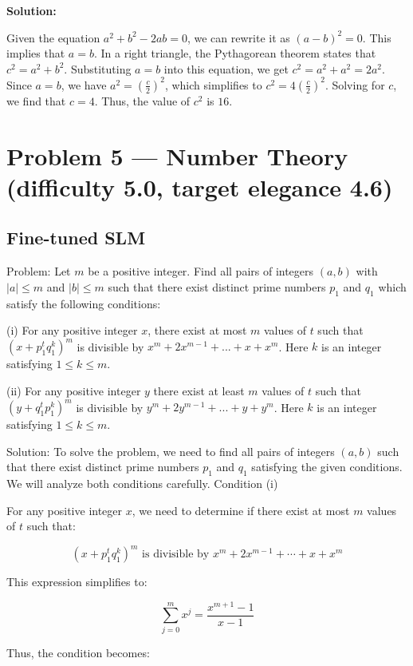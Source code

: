 \documentclass[11pt]{article}
\begin{document}
\textbf{Solution:}

Given the equation $a^2 + b^2 - 2ab = 0$, we can rewrite it as $(a - b)^2 = 0$. This implies that $a = b$. In a right triangle, the Pythagorean theorem states that $c^2 = a^2 + b^2$. Substituting $a = b$ into this equation, we get $c^2 = a^2 + a^2 = 2a^2$. Since $a = b$, we have $a^2 = \left(\frac{c}{2}\right)^2$, which simplifies to $c^2 = 4\left(\frac{c}{2}\right)^2$. Solving for $c$, we find that $c = 4$. Thus, the value of $c^2$ is $\boxed{16}$.

\section*{Problem 5 --- Number Theory (difficulty 5.0, target elegance 4.6)}

\subsection*{Fine-tuned SLM}

Problem:
Let $m$ be a positive integer. Find all pairs of integers $(a, b)$ with $|a| \le m$ and $|b| \le m$ such that there exist distinct prime numbers $p_1$ and $q_1$ which satisfy the following conditions:

(i) For any positive integer $x$, there exist at most $m$ values of $t$ such that
$\textstyle\left(x+p_1^{t} q_1^{k}\right)^{m}$ is divisible by $x^{m}+2 x^{m-1}+...+x+x^{m}$. Here $k$ is an integer satisfying $1\le k\le m$.

(ii) For any positive integer $y$ there exist at least $m$ values of $t$ such that 
$\textstyle\left(y+q_1^{t} p_1^{k}\right)^{m}$ is divisible by $y^{m}+2 y^{m-1}+...+y+y^{m}$. Here $k$ is an integer satisfying $1\le k\le m$.

Solution:
To solve the problem, we need to find all pairs of integers \((a, b)\) such that there exist distinct prime numbers \(p_1\) and \(q_1\) satisfying the given conditions. We will analyze both conditions carefully.
Condition (i)

For any positive integer \(x\), we need to determine if there exist at most \(m\) values of \(t\) such that:

\[
\left(x + p_1^{t} q_1^{k}\right)^{m} \text{ is divisible by } x^{m} + 2 x^{m-1} + \cdots + x + x^{m}
\]

This expression simplifies to:

\[
\sum_{j=0}^{m} x^{j} = \frac{x^{m+1} - 1}{x-1}
\]

Thus, the condition becomes:
\end{document}
